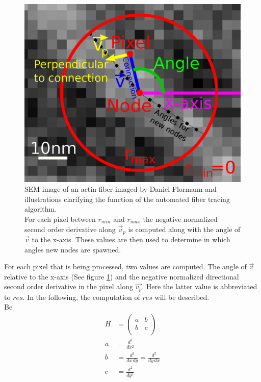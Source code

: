 \documentclass[12pt,english,twocolumn]{revtex4}
\begin{document}
\begin{figure}[h]
	\includegraphics[width=\linewidth]{figures/tracking_illustration.eps}
	\caption{SEM image of an actin fiber imaged by Daniel Flormann and illustrations clarifying the function of the automated fiber tracing algorithm.\\
	For each pixel between $r_{min}$ and $r_{max}$ the negative normalized second order derivative along $\vec{v}_p$ is computed along with the angle of $\vec{v}$ to the x-axis. These values are then used to determine in which angles new nodes are spawned.}
	\label{fig:track_ill}
\end{figure}
For each pixel that is being processed, two values are computed. The angle of $\vec{v}$ relative to the x-axis (See figure \ref{fig:track_ill}) and the negative normalized directional second order derivative in the pixel along $\vec{v_p}$. Here the latter value is abbreviated to $res$. In the following, the computation of $res$ will be described.\\
Be 
\begin{align*}
    H &=
    \left(
    \begin{array}{rr}
        a & b \\
        b & c \\
    \end{array}
    \right)\\
    a &= \frac{d^{2}}{dx^{2}} \\
    b &= \frac{d^{2}}{dx \, dy} = \frac{d^{2}}{dy \, dx}\\
    c &= \frac{d^{2}}{dy^{2}}\\
\end{align*}
\end{document}
